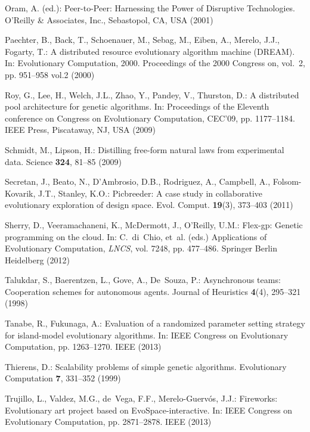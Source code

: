 \begin{thebibliography}{10}
Oram, A. (ed.): Peer-to-Peer: Harnessing the Power of Disruptive Technologies.
\newblock O'Reilly \& Associates, Inc., Sebastopol, CA, USA (2001)

Paechter, B., Back, T., Schoenauer, M., Sebag, M., Eiben, A., Merelo, J.J.,
  Fogarty, T.: A distributed resource evolutionary algorithm machine ({DREAM}).
\newblock In: Evolutionary Computation, 2000. Proceedings of the 2000 Congress
  on, vol.~2, pp. 951--958 vol.2 (2000)

Roy, G., Lee, H., Welch, J.L., Zhao, Y., Pandey, V., Thurston, D.: A
  distributed pool architecture for genetic algorithms.
\newblock In: Proceedings of the Eleventh conference on Congress on
  Evolutionary Computation, CEC'09, pp. 1177--1184. IEEE Press, Piscataway, NJ,
  USA (2009)

Schmidt, M., Lipson, H.: Distilling free-form natural laws from experimental
  data.
\newblock Science \textbf{324}, 81--85 (2009)

Secretan, J., Beato, N., D'Ambrosio, D.B., Rodriguez, A., Campbell, A.,
  Folsom-Kovarik, J.T., Stanley, K.O.: Picbreeder: A case study in
  collaborative evolutionary exploration of design space.
\newblock Evol. Comput. \textbf{19}(3), 373--403 (2011)

Sherry, D., Veeramachaneni, K., McDermott, J., O'Reilly, U.M.: Flex-gp: Genetic
  programming on the cloud.
\newblock In: C.~di~Chio, et~al. (eds.) Applications of Evolutionary
  Computation, \emph{LNCS}, vol. 7248, pp. 477--486. Springer Berlin Heidelberg
  (2012)

Talukdar, S., Baerentzen, L., Gove, A., De~Souza, P.: Asynchronous teams:
  Cooperation schemes for autonomous agents.
\newblock Journal of Heuristics \textbf{4}(4), 295--321 (1998)

Tanabe, R., Fukunaga, A.: Evaluation of a randomized parameter setting strategy
  for island-model evolutionary algorithms.
\newblock In: IEEE Congress on Evolutionary Computation, pp. 1263--1270. IEEE
  (2013)

Thierens, D.: Scalability problems of simple genetic algorithms.
\newblock Evolutionary Computation \textbf{7}, 331--352 (1999)

Trujillo, L., Valdez, M.G., de~Vega, F.F., Merelo-Guerv\'os, J.J.: {Fireworks:
  Evolutionary art project based on EvoSpace-interactive}.
\newblock In: IEEE Congress on Evolutionary Computation, pp. 2871--2878. IEEE
  (2013)


\end{thebibliography}
